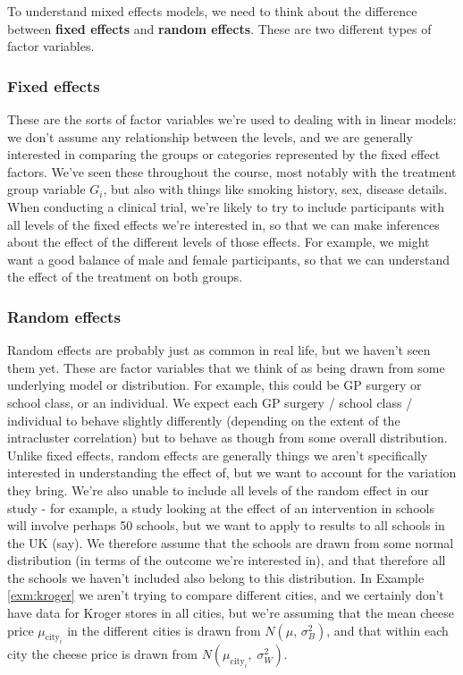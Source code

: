 \documentclass[
  openany]{book}
\theoremstyle{definition}
\theoremstyle{definition}
\theoremstyle{definition}
\theoremstyle{definition}
\theoremstyle{remark}
\begin{document}
To understand mixed effects models, we need to think about the difference between \textbf{fixed effects} and \textbf{random effects}. These are two different types of factor variables.

\subsubsection*{Fixed effects}\label{fixed-effects}

These are the sorts of factor variables we're used to dealing with in linear models: we don't assume any relationship between the levels, and we are generally interested in comparing the groups or categories represented by the fixed effect factors. We've seen these throughout the course, most notably with the treatment group variable \(G_i\), but also with things like smoking history, sex, disease details. When conducting a clinical trial, we're likely to try to include participants with all levels of the fixed effects we're interested in, so that we can make inferences about the effect of the different levels of those effects. For example, we might want a good balance of male and female participants, so that we can understand the effect of the treatment on both groups.

\subsubsection*{Random effects}\label{random-effects}

Random effects are probably just as common in real life, but we haven't seen them yet. These are factor variables that we think of as being drawn from some underlying model or distribution. For example, this could be GP surgery or school class, or an individual. We expect each GP surgery / school class / individual to behave slightly differently (depending on the extent of the intracluster correlation) but to behave as though from some overall distribution. Unlike fixed effects, random effects are generally things we aren't specifically interested in understanding the effect of, but we want to account for the variation they bring. We're also unable to include all levels of the random effect in our study - for example, a study looking at the effect of an intervention in schools will involve perhaps 50 schools, but we want to apply to results to all schools in the UK (say). We therefore assume that the schools are drawn from some normal distribution (in terms of the outcome we're interested in), and that therefore all the schools we haven't included also belong to this distribution. In Example \ref{exm:kroger} we aren't trying to compare different cities, and we certainly don't have data for Kroger stores in all cities, but we're assuming that the mean cheese price \(\mu_{\text{city}_i}\) in the different cities is drawn from \(N\left(\mu,\,\sigma^2_B\right)\), and that within each city the cheese price is drawn from \(N\left(\mu_{\text{city}_i},\;\sigma^2_W\right)\).
\end{document}
